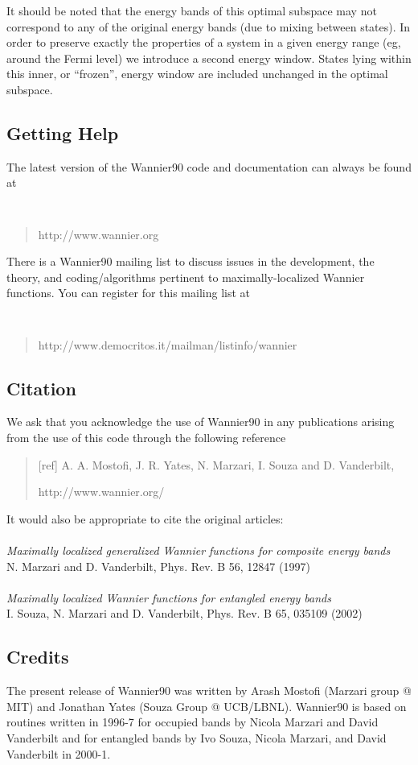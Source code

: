 It should be noted that the energy bands of this
optimal subspace may not correspond to any of the original energy
bands (due to mixing between states). In order to preserve exactly the
properties of a system in a given energy range (eg, around the Fermi
level) we introduce a second  energy window. States lying
within this inner, or ``frozen'', energy window are included unchanged
in the optimal subspace.

\subsection{Getting Help}
The latest version of the Wannier90 code and documentation can always be found at
{\tt 
\begin{quote}
http://www.wannier.org
\end{quote} }
There is a Wannier90 mailing list to
discuss issues in the development, the theory, and coding/algorithms
pertinent to maximally-localized Wannier functions.
You can register for this mailing list at
{\tt
\begin{quote}
http://www.democritos.it/mailman/listinfo/wannier
\end{quote} }

\subsection{Citation}
We ask that you acknowledge the use of Wannier90 in any publications
arising from the use of this code through the following reference
\begin{quote}
[ref] A. A. Mostofi, J. R. Yates,
N. Marzari, I. Souza and D. Vanderbilt,  

 http://www.wannier.org/                 
\end{quote}                                                              

It would also be appropriate to cite the original articles:\\\\
{\it Maximally localized generalized Wannier functions for composite energy bands}\\
N. Marzari and D. Vanderbilt, Phys. Rev. B 56, 12847 (1997)\\\\
{\it Maximally localized Wannier functions for entangled energy bands}\\
I. Souza, N. Marzari and D. Vanderbilt, Phys. Rev. B 65, 035109 (2002)


\subsection{Credits}
The present release of Wannier90 was written by Arash Mostofi (Marzari
group @ MIT) and Jonathan Yates (Souza Group @ UCB/LBNL). Wannier90 is
based on routines written in 1996-7 for occupied bands by Nicola Marzari
and David Vanderbilt and for entangled bands by Ivo Souza, Nicola Marzari,
and David Vanderbilt in 2000-1. 

